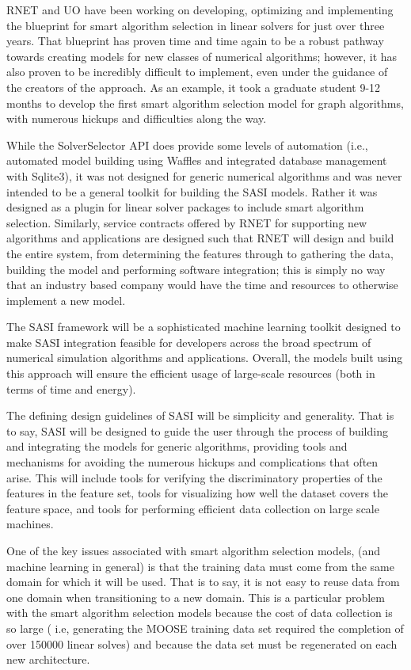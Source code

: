 RNET and UO have been working on developing, optimizing and implementing the blueprint for smart algorithm selection in linear solvers for just over three years. That blueprint has proven time and time again to be a robust pathway towards creating models for new classes of numerical algorithms; however, it has also proven to be incredibly difficult to implement, even under the guidance of the creators of the approach. As an example, it took a graduate student 9-12 months to develop the first smart algorithm selection model for graph algorithms, with numerous hickups and difficulties along the way. 

While the SolverSelector API does provide some levels of automation (i.e., automated model building using Waffles and integrated database management with Sqlite3), it was not designed for generic numerical algorithms and was never intended to be a general toolkit for building the SASI models. Rather it was designed as a plugin for linear solver packages to include smart algorithm selection. Similarly, service contracts offered by RNET for supporting new algorithms and applications are designed such that RNET will design and build the entire system, from determining the features through  to gathering the data, building the model and performing software integration; this is simply no way that an industry based company would have the time and resources to otherwise implement a new model. 

The SASI framework will be a sophisticated machine learning toolkit designed to make SASI integration feasible for developers across the broad spectrum of numerical simulation algorithms and applications. Overall, the models built using this approach will ensure the efficient usage of large-scale resources (both in terms of time and energy). 

The defining design guidelines of SASI will be simplicity and generality. That is to say, SASI will be designed to guide the user through the process of building and integrating the models for generic algorithms, providing tools and mechanisms for avoiding the numerous hickups and complications that often arise. This will include tools for verifying the discriminatory properties of the features in the feature set, tools for visualizing how well the dataset covers the feature space, and tools for performing efficient data collection on large scale machines. 

One of the key issues associated with smart algorithm selection models,  (and machine learning in general) is that the training data must come from the same domain for which it will be used. That is to say, it is not easy to reuse data from one domain when transitioning to a new domain. This is a particular problem with the smart algorithm selection models because the cost of data collection is so large ( i.e, generating the MOOSE training data set required the completion of over 150000 linear solves) and because the data set must be regenerated on each new architecture. 

